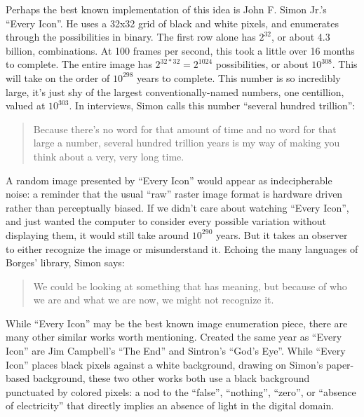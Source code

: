 \documentclass{thesis}
\begin{document}
Perhaps the best known implementation of this idea is John F. Simon Jr.'s ``Every Icon''\cite{john_f._simon_jr._every_????}. He uses a 32x32 grid of black and white pixels, and enumerates through the possibilities in binary. The first row alone has $2^{32}$, or about 4.3 billion, combinations. At 100 frames per second, this took a little over 16 months to complete. The entire image has $2^{32*32}=2^{1024}$ possibilities, or about $10^{308}$. This will take on the order of $10^{298}$ years to complete. This number is so incredibly large, it's just shy of the largest conventionally-named numbers, one centillion, valued at $10^{303}$. In interviews, Simon calls this number ``several hundred trillion''\cite{matthew_mirapaul_in_1997}:
	
	\begin{quote}
	Because there's no word for that amount of time and no word for that large a number, several hundred trillion years is my way of making you think about a very, very long time.
	\end{quote}
	
A random image presented by ``Every Icon'' would appear as indecipherable noise: a reminder that the usual ``raw'' raster image format is hardware driven rather than perceptually biased. If we didn't care about watching ``Every Icon'', and just wanted the computer to consider every possible variation without displaying them, it would still take around $10^{290}$ years. But it takes an observer to either recognize the image or misunderstand it. Echoing the many languages of Borges' library, Simon says:
	
	\begin{quote}
	We could be looking at something that has meaning, but because of who we are and what we are now, we might not recognize it.
	\end{quote}
	
While ``Every Icon'' may be the best known image enumeration piece, there are many other similar works worth mentioning. Created the same year as ``Every Icon'' are Jim Campbell's ``The End''\cite{jim_campbell_end_1996} and Sintron's ``God's Eye''\cite{sintron_gods_2003}. While ``Every Icon'' places black pixels against a white background, drawing on Simon's paper-based background, these two other works both use a black background punctuated by colored pixels: a nod to the ``false'', ``nothing'', ``zero'',  or ``absence of electricity'' that directly implies an absence of light in the digital domain.
	
\end{document}

